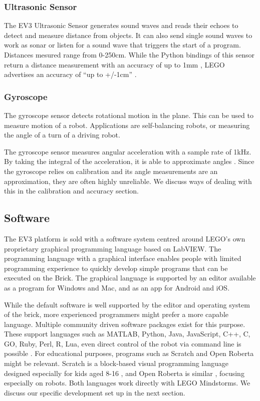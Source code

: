 \documentclass[11pt, a4paper]{article}
\begin{document}
	\subsubsection*{Ultrasonic Sensor}
	The EV3 Ultrasonic Sensor generates sound waves and reads their echoes to detect and measure distance from objects. It can also send single sound waves to work as sonar or listen for a sound wave that triggers the start of a program. Distances mesured range from 0-250cm. While the Python bindings of this sensor return a distance measurement with an accuracy of up to 1mm \cite{ev3_python}, LEGO advertises an accuracy of  ``up to +/-1cm'' \cite{ultraosnic_sensor}.
	
	
	\subsubsection*{Gyroscope} \label{gyro_section}
	The gyroscope sensor detects rotational motion in the plane. This can be used to measure motion of a robot. Applications are self-balancing robots, or measuring the angle of a turn of a driving robot.
	
	The gyroscope sensor measures angular acceleration with a sample rate of 1kHz. By taking the integral of the acceleration, it is able to approximate angles \cite{gyroscope}. Since the gyroscope relies on calibration and its angle measurements are an approximation, they are often highly unreliable. We discuss ways of dealing with this in the calibration and accuracy section.
	
	
	\subsection{Software}
	The EV3 platform is sold with a software system centred around LEGO's own proprietary graphical programming language based on LabVIEW. The programming language with a graphical interface enables people with limited programming experience to quickly develop simple programs that can be executed on the Brick. The graphical language is supported by an editor available as a program for Windows and Mac, and as an app for Android and iOS.
	
	While the default software is well supported by the editor and operating system of the brick, more experienced programmers might prefer a more capable language. Multiple community driven software packages exist for this purpose. These support languages such as MATLAB, Python, Java, JavaScript, C++, C, GO, Ruby, Perl, R, Lua, even direct control of the robot via command line is possible \cite{ev3dev}. For educational purposes, programs such as Scratch and Open Roberta might be relevant. Scratch is a block-based visual programming language designed especially for kids aged 8-16 \cite{scratch}, and Open Roberta is similar \cite{roberta}, focusing especially on robots. Both languages work directly with LEGO Mindstorms. We discuss our specific development set up in the next section.
	
\end{document}
